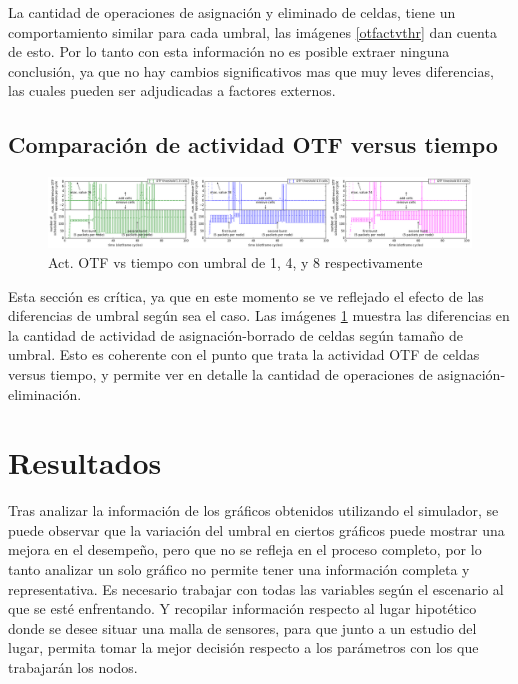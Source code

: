     La cantidad de operaciones de asignación y eliminado de celdas, tiene un comportamiento similar para cada umbral, las imágenes \ref{otfactvthr} dan cuenta de esto. Por lo tanto con esta información no es posible extraer ninguna conclusión, ya que no hay cambios significativos mas que muy leves diferencias, las cuales pueden ser adjudicadas a factores externos.

\subsection{Comparación de actividad OTF versus tiempo}

        \begin{figure}[h]
        \graphicspath{ {imagenes/agrupadas/} }
        \centering
        \includegraphics[width=1.0\textwidth]{numcellsotfactivtime.png}
        \caption{Act. OTF vs tiempo con umbral de 1, 4, y 8 respectivamente}
        \label{otfcomp}
        \end{figure}


    Esta sección es crítica, ya que en este momento se ve reflejado el efecto de las diferencias de umbral según sea el caso. Las imágenes \ref{otfcomp} muestra las diferencias en la cantidad de actividad de asignación-borrado de celdas según tamaño de umbral. Esto es coherente con el punto que trata la actividad OTF de celdas versus tiempo, y permite ver en detalle la cantidad de operaciones de asignación-eliminación.
    


\section{Resultados}
    
Tras analizar la información de los gráficos obtenidos utilizando el simulador, se puede observar que la variación del umbral en ciertos gráficos puede mostrar una mejora en el desempeño, pero que no se refleja en el proceso completo, por lo tanto analizar un solo gráfico no permite tener una información completa y representativa.
Es necesario trabajar con todas las variables según el escenario al que se esté enfrentando. Y recopilar información respecto al lugar hipotético donde se desee situar una malla de sensores, para que junto a un estudio del lugar, permita tomar la mejor decisión respecto a los parámetros con los que trabajarán los nodos.